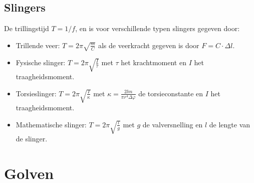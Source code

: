 \documentclass[twoside]{report}
\begin{document}
\section{Slingers}
De trillingstijd $T=1/f$, en is voor verschillende typen slingers gegeven door:
\begin{itemize}
\item Trillende veer: $\displaystyle T=2\pi\sqrt{\frac{m}{C}}$ als de
      veerkracht gegeven is door $F=C\cdot\Delta l$.
\item Fysische slinger: $\displaystyle T=2\pi\sqrt{\frac{I}{\tau}}$ met
      $\tau$ het krachtmoment en $I$ het traagheidsmoment.
\item Torsieslinger: $\displaystyle T=2\pi\sqrt{\frac{I}{\kappa}}$ met
      $\displaystyle\kappa=\frac{2lm}{\pi r^4\Delta\varphi}$ de torsieconstante
      en $I$ het traagheidsmoment.
\item Mathematische slinger: $\displaystyle T=2\pi\sqrt{\frac{l}{g}}$ met
      $g$ de valversnelling en $l$ de lengte van de slinger.
\end{itemize}

\chapter{Golven}
\end{document}

